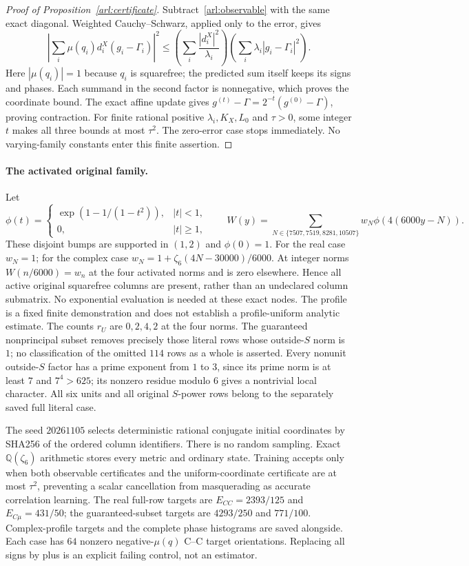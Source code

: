 \begin{proof}[Proof of Proposition~\ref{arl:certificate}]
Subtract~\eqref{arl:observable} with the same exact diagonal. Weighted
Cauchy--Schwarz, applied only to the error, gives
\[
 \left|\sum_i\mu(q_i)d_i^X(g_i-\Gamma_i)\right|^2
 \le\left(\sum_i\frac{|d_i^X|^2}{\lambda_i}\right)
     \left(\sum_i\lambda_i|g_i-\Gamma_i|^2\right).
\]
Here $|\mu(q_i)|=1$ because $q_i$ is squarefree; the predicted sum itself
keeps its signs and phases. Each summand in the second factor is nonnegative,
which proves the coordinate bound. The exact affine update gives
$g^{(t)}-\Gamma=2^{-t}(g^{(0)}-\Gamma)$, proving contraction.
For finite rational positive $\lambda_i,K_X,L_0$ and $\tau>0$, some integer
$t$ makes all three bounds at most $\tau^2$. The zero-error case stops
immediately. No varying-family constants enter this finite assertion.
\end{proof}

\paragraph{The activated original family.}
Let
\[
 \phi(t)=\begin{cases}\exp(1-1/(1-t^2)),&|t|<1,\\0,&|t|\ge1,\end{cases}
 \qquad W(y)=\sum_{N\in\{7507,7519,8281,10507\}}
                     w_N\phi(4(6000y-N)).
\]
These disjoint bumps are supported in $(1,2)$ and $\phi(0)=1$.
For the real case $w_N=1$; for the complex case
$w_N=1+\zeta_6(4N-30000)/6000$.
At integer norms $W(n/6000)=w_n$ at the four activated norms and is zero
elsewhere. Hence all active original squarefree columns are present, rather
than an undeclared column submatrix. No exponential evaluation is needed
at these exact nodes. The profile is a fixed finite demonstration and does
not establish a profile-uniform analytic estimate.
The counts $r_U$ are $0,2,4,2$ at the four norms.
The guaranteed nonprincipal subset removes precisely those literal rows whose
outside-$S$ norm is $1$; no classification of the omitted $114$ rows as a
whole is asserted. Every nonunit outside-$S$ factor has a prime exponent
from $1$ to $3$, since its prime norm is at least $7$ and $7^4>625$;
its nonzero residue modulo $6$ gives a nontrivial local character.
All six units and all original $S$-power rows belong to
the separately saved full literal case.

The seed $20261105$ selects deterministic rational conjugate initial
coordinates by SHA256 of the ordered column identifiers. There is no random
sampling. Exact $\mathbb Q(\zeta_6)$ arithmetic stores every metric and
ordinary state. Training accepts only when both observable certificates and
the uniform-coordinate certificate are at most $\tau^2$, preventing a
scalar cancellation from masquerading as accurate correlation learning.
The real full-row targets are $E_{CC}=2393/125$ and $E_{C\mu}=431/50$;
the guaranteed-subset targets are $4293/250$ and $771/100$.
Complex-profile targets and the complete phase histograms are saved alongside.
Each case has $64$ nonzero negative-$\mu(q)$ C--C target orientations.
Replacing all signs by plus is an explicit failing control, not an estimator.

